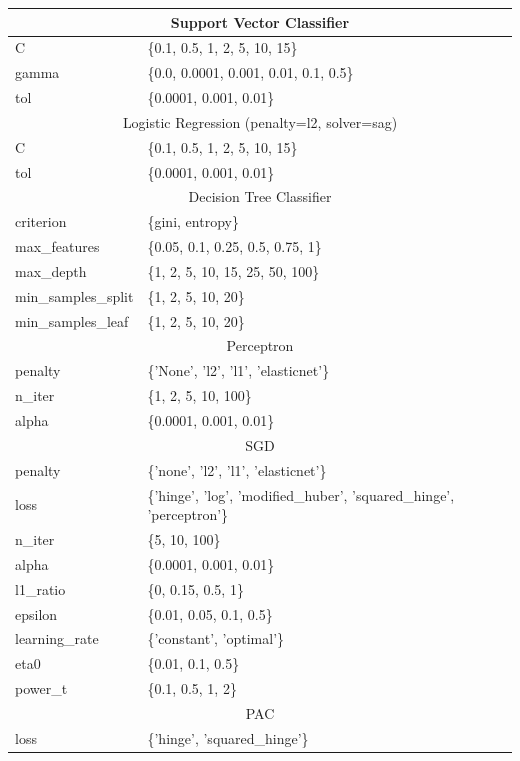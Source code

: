 \documentclass{ws-ijait}
\begin{document}
\begin{table}
{\begin{tabular}{ll}
\hline
\multicolumn{2}{c}{Support Vector Classifier} \\
\hline
C & \{0.1, 0.5, 1, 2, 5, 10, 15\} \\
gamma & \{0.0, 0.0001, 0.001, 0.01, 0.1, 0.5\} \\
tol & \{0.0001, 0.001, 0.01\} \\
\hline
\multicolumn{2}{c}{Logistic Regression (penalty=l2, solver=sag)} \\
\hline
C & \{0.1, 0.5, 1, 2, 5, 10, 15\} \\
tol & \{0.0001, 0.001, 0.01\} \\
\hline
\multicolumn{2}{c}{Decision Tree Classifier} \\
\hline
criterion & \{gini, entropy\} \\
max\_features & \{0.05, 0.1, 0.25, 0.5, 0.75, 1\} \\
max\_depth & \{1, 2, 5, 10, 15, 25, 50, 100\} \\
min\_samples\_split & \{1, 2, 5, 10, 20\} \\
min\_samples\_leaf & \{1, 2, 5, 10, 20\} \\
\hline
\multicolumn{2}{c}{Perceptron} \\
\hline
penalty & \{'None', 'l2', 'l1', 'elasticnet'\} \\
n\_iter  & \{1, 2, 5, 10, 100\} \\
alpha & \{0.0001, 0.001, 0.01\} \\
\hline
\multicolumn{2}{c}{SGD} \\
\hline
penalty & \{'none', 'l2', 'l1', 'elasticnet'\} \\
loss & \{'hinge', 'log', 'modified\_huber', 'squared\_hinge', 'perceptron'\} \\
n\_iter & \{5, 10, 100\} \\
alpha & \{0.0001, 0.001, 0.01\} \\
l1\_ratio & \{0, 0.15, 0.5, 1\} \\
epsilon & \{0.01, 0.05, 0.1, 0.5\} \\
learning\_rate & \{'constant', 'optimal'\} \\
eta0 & \{0.01, 0.1, 0.5\} \\
power\_t & \{0.1, 0.5, 1, 2\} \\
\hline
\multicolumn{2}{c}{PAC} \\
\hline
loss & \{'hinge', 'squared\_hinge'\} \\

\end{tabular}}
\end{table}
\end{document}
